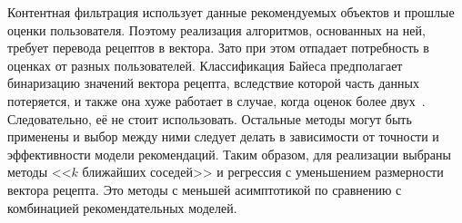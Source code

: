 Контентная фильтрация использует данные рекомендуемых объектов и прошлые оценки пользователя.
Поэтому реализация алгоритмов, основанных на ней, требует перевода рецептов в вектора.
Зато при этом отпадает потребность в оценках от разных пользователей.
Классификация Байеса предполагает бинаризацию значений вектора рецепта, вследствие которой часть данных потеряется, и также она хуже работает в случае, когда оценок более двух~\cite{aggarwal}.
Следовательно, её не стоит использовать.
Остальные методы могут быть применены и выбор между ними следует делать в зависимости от точности и эффективности модели рекомендаций.
Таким образом, для реализации выбраны методы <<$k$ ближайших соседей>> и регрессия с уменьшением размерности вектора рецепта.
Это методы с меньшей асимптотикой по сравнению с комбинацией рекомендательных моделей.